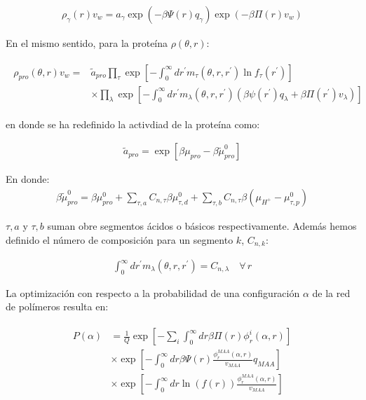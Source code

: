 \begin{align}
	\rho_\gamma(r)v_w = a_\gamma \exp{\left(-\beta \Psi(r)q_\gamma\right)} \exp{\left(-\beta\Pi(r) v_w\right)}
\end{align}


En el mismo sentido, para la prote\'ina $\rho(\theta,r)$:
	
	

\begin{align}
	\begin{aligned}
		\rho_{pro}(\theta, r)v_w = & \tilde{a}_{pro} \prod_\tau \exp\left[ -\int_0^\infty dr^\prime  m_\tau(\theta,r,r^\prime) \ln f_\tau(r^\prime)\right] \\
		& \times \prod_\lambda \exp\left[ -\int_0^\infty dr^\prime  m_\lambda(\theta,r,r^\prime)\left( \beta\psi(r^\prime) q_\lambda + \beta \Pi(r^\prime) v_\lambda \right)\right]
	\end{aligned}
	\label{eq:esf:rho-pro}
\end{align}
	
	\noindent en donde se ha redefinido la activdiad de la prote\'ina como:
	
	\begin{align}
		\tilde{a}_{pro} = \exp[\beta\mu_{pro} - \beta\tilde{\mu}^0_{pro}]
	\end{align}
	
		
En donde:
\begin{align}
	\beta\tilde{\mu}^0_{pro} =  \beta \mu^0_{pro}  + \sum_{\tau,a} C_{n,\tau}\beta\mu^0_{\tau,d} 
	+ \sum_{\tau,b} C_{n,\tau}\beta(\mu_{H^+} - \mu^0_{\tau,p})
\end{align}


\noindent $\tau,a$ y  $\tau,b$ suman obre segmentos \'acidos o b\'asicos respectivamente. Adem\'as hemos definido el n\'umero de composici\'on para un segmento $k$, $C_{n,k}$:

	\begin{align}
		\int_0^\infty dr^\prime  m_\lambda(\theta,r,r^\prime) = C_{n,\lambda}\quad \forall \, r
		\label{eq:esf:composition}
	\end{align}

La optimizaci\'on con respecto a la probabilidad de una configuraci\'on $\alpha$ de la red de pol\'imeros resulta en:


\begin{align}
	\begin{aligned}
		P(\alpha)&=\frac{1}{Q}\exp\left[- \sum_i{\int_0^\infty{dr\beta\Pi(r)\phi^i_r(\alpha,r)}}\right] \\
		& \times \exp \left[ -\int_0^\infty dr \beta \Psi(r)\frac{\phi^{MAA}_r(\alpha,r)}{v_{MAA}} q_{MAA}  \right] \\
		& \times \exp\left[ -\int_0^\infty{ dr\ln(f(r))\frac{\phi^{MAA}_r(\alpha,r)}{v_{MAA}}}\right] \\
	\end{aligned}
	\label{eq:esf:proba-alfa}
\end{align}


